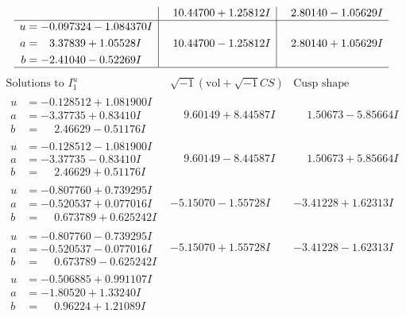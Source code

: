 \documentclass[1p]{elsarticle_modified}
\theoremstyle{definition}
\newcommand{\I}{\sqrt{-1}}
\begin{document}
$$\begin{array}{c|c|c}
 & \phantom{-}10.44700 + 1.25812 I & \phantom{-}2.80140 - 1.05629 I \\ \hline\begin{aligned}
u &= -0.097324 - 1.084370 I \\
a &= \phantom{-}3.37839 + 1.05528 I \\
b &= -2.41040 - 0.52269 I\end{aligned}
 & \phantom{-}10.44700 - 1.25812 I & \phantom{-}2.80140 + 1.05629 I\\
 \hline 
 \end{array}$$\newpage$$\begin{array}{c|c|c}  
\text{Solutions to }I^u_{1}& \I (\text{vol} + \sqrt{-1}CS) & \text{Cusp shape}\\
 \hline 
\begin{aligned}
u &= -0.128512 + 1.081900 I \\
a &= -3.37735 + 0.83410 I \\
b &= \phantom{-}2.46629 - 0.51176 I\end{aligned}
 & \phantom{-}9.60149 + 8.44587 I & \phantom{-}1.50673 - 5.85664 I \\ \hline\begin{aligned}
u &= -0.128512 - 1.081900 I \\
a &= -3.37735 - 0.83410 I \\
b &= \phantom{-}2.46629 + 0.51176 I\end{aligned}
 & \phantom{-}9.60149 - 8.44587 I & \phantom{-}1.50673 + 5.85664 I \\ \hline\begin{aligned}
u &= -0.807760 + 0.739295 I \\
a &= -0.520537 + 0.077016 I \\
b &= \phantom{-}0.673789 + 0.625242 I\end{aligned}
 & -5.15070 - 1.55728 I & -3.41228 + 1.62313 I \\ \hline\begin{aligned}
u &= -0.807760 - 0.739295 I \\
a &= -0.520537 - 0.077016 I \\
b &= \phantom{-}0.673789 - 0.625242 I\end{aligned}
 & -5.15070 + 1.55728 I & -3.41228 - 1.62313 I \\ \hline\begin{aligned}
u &= -0.506885 + 0.991107 I \\
a &= -1.80520 + 1.33240 I \\
b &= \phantom{-}0.96224 + 1.21089 I\end{aligned}

\end{array}$$
\end{document}

